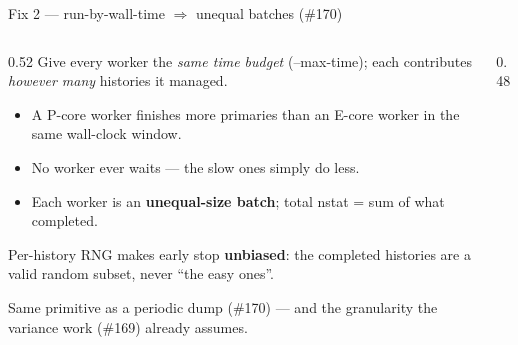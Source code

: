 \documentclass[aspectratio=169,10pt]{beamer}
\newcommand{\code}[1]{{\ttfamily\footnotesize #1}}
\begin{document}
\begin{frame}{Fix 2 — run-by-wall-time $\Rightarrow$ unequal batches (\#170)}
  \begin{columns}[T]
    \begin{column}{0.52\textwidth}
      \small
      Give every worker the \emph{same time budget} (\code{--max-time}); each
      contributes \emph{however many} histories it managed.
      \begin{itemize}\scriptsize\itemsep2pt
        \item A P-core worker finishes more primaries than an E-core worker in
              the same wall-clock window.
        \item No worker ever waits — the slow ones simply do less.
        \item Each worker is an \textbf{unequal-size batch}; total
              \code{nstat} = sum of what completed.
      \end{itemize}
      Per-history RNG makes early stop \textbf{unbiased}: the completed
      histories are a valid random subset, never ``the easy ones''.
      \medskip

      \footnotesize\color{oshGrey}
      Same primitive as a periodic dump (\#170) — and the granularity the
      variance work (\#169) already assumes.
    \end{column}
    \begin{column}{0.48\textwidth}
      \centering
    \end{column}
  \end{columns}
\end{frame}
\end{document}

